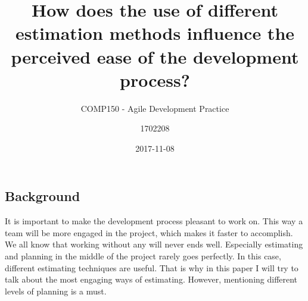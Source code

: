 \documentclass{scrartcl}
\title{How does the use of different estimation methods influence the perceived ease of the development process?}
\subtitle{COMP150 - Agile Development Practice}
\author{1702208}
\date{2017-11-08}
\begin{document}
\maketitle{}

\newpage{}

\begin{multicols}{2}

\section{Background}
It is important to make the development process pleasant to work on.
This way a team will be more engaged in the project, which makes it faster to accomplish.
We all know that working without any will never ends well.
Especially estimating and planning in the middle of the project rarely goes perfectly.
In this case, different estimating techniques are useful. 
That is why in this paper I will try to talk about the most engaging ways of estimating.
However, mentioning different levels of planning is a must.


\end{multicols}
\end{document}

